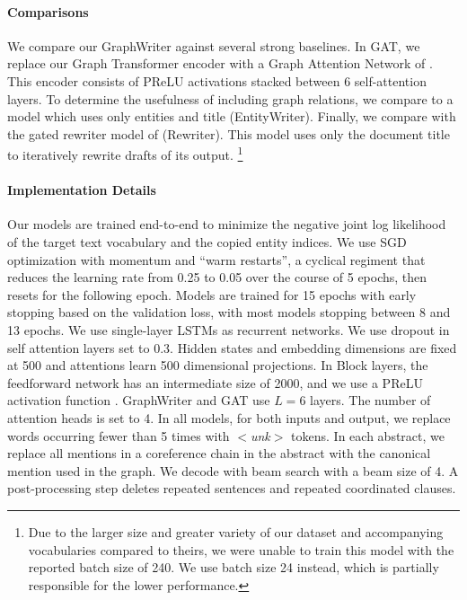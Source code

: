 \documentclass[11pt,a4paper]{article}
\begin{document}
\paragraph{Comparisons} 
We compare our GraphWriter against several strong baselines. 
In GAT, we replace our Graph Transformer encoder with a Graph Attention Network of \citep{velickovic2017graph}.
This encoder consists of PReLU activations stacked between 6 self-attention layers.
To determine the usefulness of including graph relations, we compare to a model which uses only entities and title (EntityWriter).
Finally, we compare with the gated rewriter model of \citet{wang2018paper} (Rewriter).
This model uses only the document title to iteratively rewrite drafts of its output. \footnote{Due to the larger size and greater variety of our dataset and accompanying vocabularies compared to theirs, we were unable to train this model with the reported batch size of 240. We use batch size 24 instead, which is partially responsible for the lower performance.}

\paragraph{Implementation Details}
Our models are trained end-to-end to minimize the negative joint log likelihood of the target text vocabulary and the copied entity indices. 
We use SGD optimization with momentum \cite{Qian1999OnTM} and ``warm restarts'', a cyclical regiment that reduces the learning rate from 0.25 to 0.05 over the course of 5 epochs, then resets for the following epoch.
Models are trained for 15 epochs with early stopping \cite{Prechelt:1998} based on the validation loss, with most models stopping between 8 and 13 epochs. 
We use single-layer LSTMs \cite{Hochreiter:1997} as recurrent networks.
We use dropout \cite{Srivastava:2014} in self attention layers set to 0.3.
Hidden states and embedding dimensions are fixed at 500 and attentions learn 500 dimensional projections.
In Block layers, the feedforward network has an intermediate size of 2000, and we use a PReLU activation function \cite{he2015delving}.
GraphWriter and GAT use $L=6$ layers. 
The number of attention heads is set to 4. 
In all models, for both inputs and output, we replace words occurring fewer than 5 times with $<${\it unk}$>$ tokens. 
In each abstract, we replace all mentions in a coreference chain in the abstract with the canonical mention used in the graph.
We decode with beam search \cite{graves2012sequence,sutskever2014sequence} with a beam size of 4. 
A post-processing step deletes repeated sentences and repeated coordinated clauses.
\end{document}
